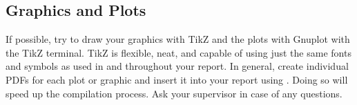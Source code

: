 \subsection{Graphics and Plots}

If possible, try to draw your graphics with TikZ and the plots with Gnuplot with the TikZ terminal. TikZ is flexible, neat, and capable of using just the same fonts and symbols as used in and throughout your report. In general, create individual PDFs for each plot or graphic and insert it into your report using . Doing so will speed up the compilation process. Ask your supervisor in case of any questions.

